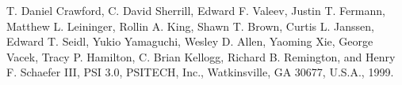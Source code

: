 T. Daniel Crawford, C. David Sherrill, Edward F. Valeev, Justin T. Fermann,
Matthew L. Leininger, Rollin A. King, Shawn T. Brown, Curtis L. Janssen,
Edward T. Seidl, Yukio Yamaguchi, Wesley D. Allen, Yaoming Xie, George Vacek,
Tracy P. Hamilton, C. Brian Kellogg, Richard B. Remington,
and Henry F. Schaefer III, PSI 3.0, PSITECH, Inc., Watkinsville,
GA 30677, U.S.A., 1999.